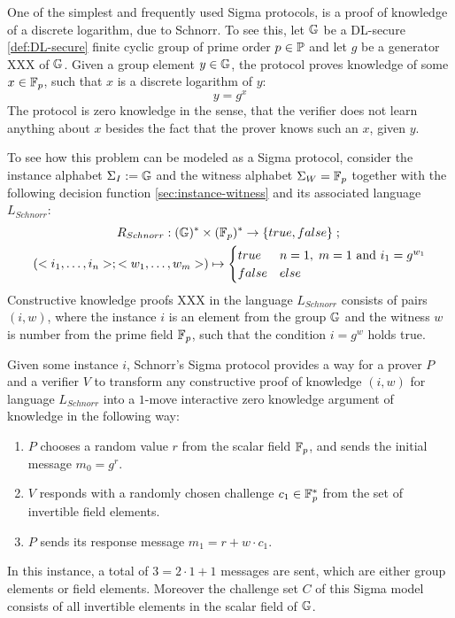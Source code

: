 \begin{example}
\label{ex:interactive-Schnorr}
One of the simplest and frequently used Sigma protocols, is a proof of knowledge of a discrete logarithm,  due to Schnorr. To see this, let $\mathbb{G}$ be a DL-secure \ref{def:DL-secure} finite cyclic group of prime order $p\in\mathbb{P}$ and let $g$ be a generator XXX of $\mathbb{G}$. Given a group element $y\in \mathbb{G}$, the protocol proves knowledge of some $x \in \mathbb{F}_p$, such that $x$ is a discrete logarithm of $y$:
$$
y = g^x
$$
The protocol is zero knowledge in the sense, that the verifier does not learn anything about $x$ besides the fact that the prover knows such an $x$, given $y$.

To see how this problem can be modeled as a Sigma protocol, consider the instance alphabet $\Sigma_I:=\mathbb{G}$ and the witness alphabet $\Sigma_W= \mathbb{F}_p$ together with the following decision function \ref{sec:instance-witness} and its associated language $L_{Schnorr}$:
\begin{multline*}
R_{Schnorr} : (\mathbb{G})^* \times (\mathbb{F}_p)^* \to \{true, false\}\;;\;\\
(<i_1,\ldots,i_n>;<w_1,\ldots, w_m>) \mapsto
\begin{cases}
true & n=1,\; m=1 \text{ and } i_1 = g^{w_1}\\
false & else
\end{cases}
\end{multline*}
Constructive knowledge proofs XXX in the language $L_{Schnorr}$ consists of pairs $(i,w)$, where the instance $i$ is an element from the group $\mathbb{G}$ and the witness $w$ is number from the prime field $\mathbb{F}_p$, such that the condition $i=g^w$ holds true.

Given some instance $i$, Schnorr's Sigma protocol provides a way for a prover $P$ and a verifier $V$ to transform any constructive proof of knowledge $(i,w)$ for language $L_{Schnorr}$ into a $1$-move interactive zero knowledge argument of knowledge in the following way:
\begin{enumerate}
\item $P$ chooses a random value $r$ from the scalar field $\mathbb{F}_p$, and sends the initial message $m_0=g^r$. 
\item $V$ responds with a randomly chosen challenge $c_1\in \mathbb{F}^*_p$ from the set of invertible field elements.
\item $P$ sends its response message $m_1=r+w\cdot c_1$.
\end{enumerate}
In this instance, a total of $3=2\cdot 1 + 1$ messages are sent, which are either group elements or field elements. Moreover the challenge set $C$ of this Sigma model consists of all invertible elements in the scalar field of $\mathbb{G}$.


\end{example}
